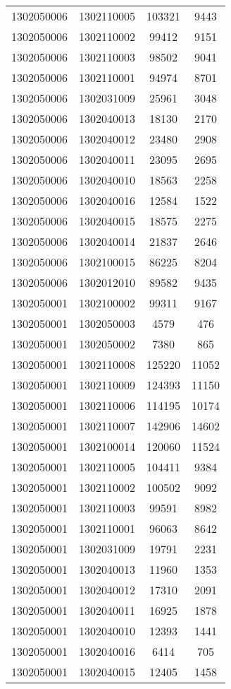 \begin{longtable}{llcc}
1302050006 & 1302110005 & 103321 & 9443\\
1302050006 & 1302110002 & 99412 & 9151\\
1302050006 & 1302110003 & 98502 & 9041\\
1302050006 & 1302110001 & 94974 & 8701\\
1302050006 & 1302031009 & 25961 & 3048\\
1302050006 & 1302040013 & 18130 & 2170\\
1302050006 & 1302040012 & 23480 & 2908\\
1302050006 & 1302040011 & 23095 & 2695\\
1302050006 & 1302040010 & 18563 & 2258\\
1302050006 & 1302040016 & 12584 & 1522\\
1302050006 & 1302040015 & 18575 & 2275\\
1302050006 & 1302040014 & 21837 & 2646\\
1302050006 & 1302100015 & 86225 & 8204\\
1302050006 & 1302012010 & 89582 & 9435\\
1302050001 & 1302100002 & 99311 & 9167\\
1302050001 & 1302050003 & 4579 & 476\\
1302050001 & 1302050002 & 7380 & 865\\
1302050001 & 1302110008 & 125220 & 11052\\
1302050001 & 1302110009 & 124393 & 11150\\
1302050001 & 1302110006 & 114195 & 10174\\
1302050001 & 1302110007 & 142906 & 14602\\
1302050001 & 1302100014 & 120060 & 11524\\
1302050001 & 1302110005 & 104411 & 9384\\
1302050001 & 1302110002 & 100502 & 9092\\
1302050001 & 1302110003 & 99591 & 8982\\
1302050001 & 1302110001 & 96063 & 8642\\
1302050001 & 1302031009 & 19791 & 2231\\
1302050001 & 1302040013 & 11960 & 1353\\
1302050001 & 1302040012 & 17310 & 2091\\
1302050001 & 1302040011 & 16925 & 1878\\
1302050001 & 1302040010 & 12393 & 1441\\
1302050001 & 1302040016 & 6414 & 705\\
1302050001 & 1302040015 & 12405 & 1458\\

\end{longtable}

